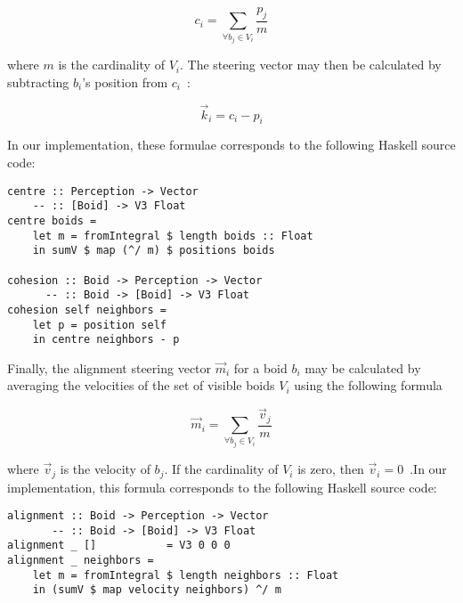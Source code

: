 \[ c_i = \sum\limits_{\forall b_j \in V_i} \frac{p_j}{m} \]

where $m$ is the cardinality of $V_i$. The steering vector may then be calculated by subtracting $b_i$'s position from $c_i$~\cite{hartman2006autonomous}:

\[ \vec{k}_i = c_i - p_i \]

In our implementation, these formulae corresponds to the following Haskell source code:

\begin{verbatim}
centre :: Perception -> Vector
    -- :: [Boid] -> V3 Float
centre boids =
    let m = fromIntegral $ length boids :: Float
    in sumV $ map (^/ m) $ positions boids

cohesion :: Boid -> Perception -> Vector
      -- :: Boid -> [Boid] -> V3 Float
cohesion self neighbors =
    let p = position self
    in centre neighbors - p
\end{verbatim}

Finally, the alignment steering vector $\vec{m}_i$ for a boid $b_i$ may be calculated by averaging the velocities of the set of visible boids $V_i$ using the following formula

\[ \vec{m}_i = \sum\limits_{\forall b_j \in V_i} \frac{\vec{v}_j}{m} \]

where $\vec{v}_j$ is the velocity of $b_j$. If the cardinality of $V_i$ is zero, then $\vec{v}_i = 0$~\cite{hartman2006autonomous}.In our implementation, this formula corresponds to the following Haskell source code:

\begin{verbatim}
alignment :: Boid -> Perception -> Vector
       -- :: Boid -> [Boid] -> V3 Float
alignment _ []           = V3 0 0 0
alignment _ neighbors =
    let m = fromIntegral $ length neighbors :: Float
    in (sumV $ map velocity neighbors) ^/ m
\end{verbatim}
\vfill
\pagebreak

 
 

